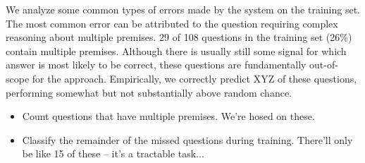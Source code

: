 We analyze some common types of errors made by the system on the training set.
The most common error can be attributed to the question requiring complex reasoning
  about multiple premises.
\num{29} of \num{108} questions in the training set (26\%) contain multiple
  premises.
Although there is usually still some signal for which answer is most likely to be correct,
  these questions are fundamentally out-of-scope for the approach.
Empirically, we correctly predict \num{XYZ} of these questions, performing somewhat 
  but not substantially above random chance.

\dome
\begin{itemize}
\item Count questions that have multiple premises. We're hosed on these.
\item Classify the remainder of the missed questions during training.
      There'll only be like 15 of these -- it's a tractable task...
\end{itemize}
